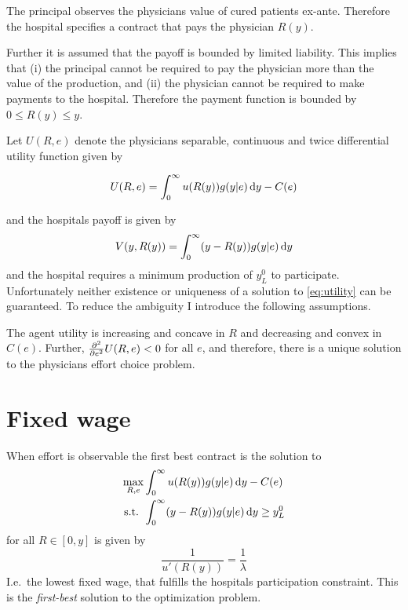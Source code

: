 The principal observes the physicians value of cured patients ex-ante. Therefore the hospital specifies a contract that pays the physician $R(y)$.

Further it is assumed that the payoff is bounded by limited liability. This implies that (i) the principal cannot be required to pay the physician more than the value of the production, and (ii) the physician cannot be required to make payments to the hospital.  Therefore the payment function is bounded by $0\leq R(y)\leq y$.

Let $U(R,e)$ denote the physicians separable, continuous and twice differential utility function given by 

\begin{align}
    U(R,e)=\int_0^\infty u(R(y))g(y|e)\dif y-C(e) \label{eq:utility}
\end{align}

and the hospitals payoff is given by 
\begin{align}
    V(y,R(y))=\int_0^\infty (y-R(y))g(y|e)\dif y
\end{align}
and the hospital requires a minimum production of $y_L^0$ to participate. 
Unfortunately neither existence or uniqueness of a solution to \cref{eq:utility} can be guaranteed. To reduce the ambiguity I introduce the following assumptions. 
\begin{assumption}
\label{asump:unique-solution}
The agent utility is increasing and concave in $R$ and decreasing and convex in $C(e)$. Further, $\pder[][2]{e}U(R,e)<0$ for all $e$, and therefore, there is a unique solution to the physicians effort choice problem.
\end{assumption}

\section{Fixed wage} %
\label{sec:fixed_wage}
When effort is observable the first best contract is the solution to 
\begin{subequations}
\label{eq:khun-tucker-fw}
\begin{align}
    \max_{R,e} & \int_0^{\infty}u(R(y))g(y|e)\dif y-C(e) \\
    \text{s.t. }    & \int_{0}^{\infty} (y-R(y))g(y|e)\dif y\geq y_L^0
\end{align}
\end{subequations}
for all $R\in[0,y]$ is given by 
\[
    \frac{1}{u'(R(y))}=\frac{1}{\lambda}
\]
I.e.\ the lowest fixed wage, that fulfills the hospitals participation constraint. This is the \emph{first-best} solution to the optimization problem. 

